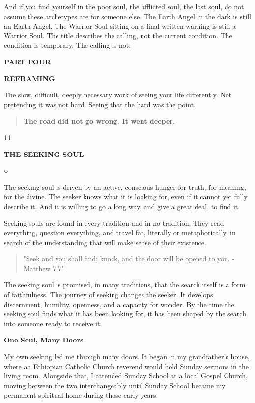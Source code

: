 And if you find yourself in the poor soul, the afflicted soul, the lost
soul, do not assume these archetypes are for someone else. The Earth
Angel in the dark is still an Earth Angel. The Warrior Soul sitting on a
final written warning is still a Warrior Soul. The title describes the
calling, not the current condition. The condition is temporary. The
calling is not.

\textbf{PART FOUR}

\textbf{REFRAMING}

The slow, difficult, deeply necessary work of seeing your life
differently. Not pretending it was not hard. Seeing that the hard was
the point.

\begin{quote}
\textbf{The road did not go wrong. It went deeper.}
\end{quote}

\textbf{11}

\textbf{THE SEEKING SOUL}

○

The seeking soul is driven by an active, conscious hunger for truth, for
meaning, for the divine. The seeker knows what it is looking for, even
if it cannot yet fully describe it. And it is willing to go a long way,
and give a great deal, to find it.

Seeking souls are found in every tradition and in no tradition. They
read everything, question everything, and travel far, literally or
metaphorically, in search of the understanding that will make sense of
their existence.

\begin{quote}
"Seek and you shall find; knock, and the door will be opened to you. -
Matthew 7:7"
\end{quote}

The seeking soul is promised, in many traditions, that the search itself
is a form of faithfulness. The journey of seeking changes the seeker. It
develops discernment, humility, openness, and a capacity for wonder. By
the time the seeking soul finds what it has been looking for, it has
been shaped by the search into someone ready to receive it.

\textbf{One Soul, Many Doors}

My own seeking led me through many doors. It began in my grandfather's
house, where an Ethiopian Catholic Church reverend would hold Sunday
sermons in the living room. Alongside that, I attended Sunday School at
a local Gospel Church, moving between the two interchangeably until
Sunday School became my permanent spiritual home during those early
years.

